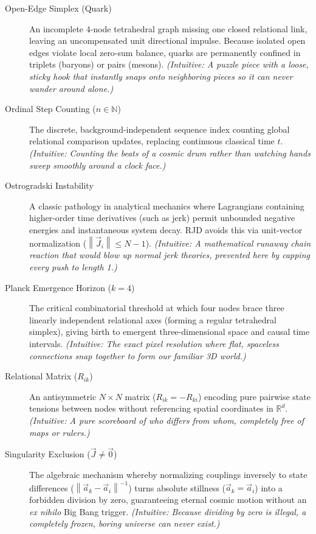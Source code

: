 \documentclass[11pt,a4paper]{article}
\theoremstyle{plain}
\theoremstyle{definition}
\theoremstyle{remark}
\newcommand{\Jerk}{\vec{J}}
\newcommand{\Acc}{\vec{a}}
\newcommand{\norm}[1]{\left\lVert #1 \right\rVert}
\begin{document}
\begin{description}
    \item[Open-Edge Simplex (Quark)] An incomplete $4$-node tetrahedral graph missing one closed relational link, leaving an uncompensated unit directional impulse. Because isolated open edges violate local zero-sum balance, quarks are permanently confined in triplets (baryons) or pairs (mesons). \emph{(Intuitive: A puzzle piece with a loose, sticky hook that instantly snaps onto neighboring pieces so it can never wander around alone.)}

    \item[Ordinal Step Counting ($n \in \mathbb{N}$)] The discrete, background-independent sequence index counting global relational comparison updates, replacing continuous classical time $t$. \emph{(Intuitive: Counting the beats of a cosmic drum rather than watching hands sweep smoothly around a clock face.)}

    \item[Ostrogradski Instability] A classic pathology in analytical mechanics where Lagrangians containing higher-order time derivatives (such as jerk) permit unbounded negative energies and instantaneous system decay. RJD avoids this via unit-vector normalization ($\norm{\Jerk_i} \leq N - 1$). \emph{(Intuitive: A mathematical runaway chain reaction that would blow up normal jerk theories, prevented here by capping every push to length 1.)}

    \item[Planck Emergence Horizon ($k=4$)] The critical combinatorial threshold at which four nodes brace three linearly independent relational axes (forming a regular tetrahedral simplex), giving birth to emergent three-dimensional space and causal time intervals. \emph{(Intuitive: The exact pixel resolution where flat, spaceless connections snap together to form our familiar 3D world.)}

    \item[Relational Matrix ($R_{ik}$)] An antisymmetric $N \times N$ matrix ($R_{ik} = -R_{ki}$) encoding pure pairwise state tensions between nodes without referencing spatial coordinates in $\mathbb{R}^d$. \emph{(Intuitive: A pure scoreboard of who differs from whom, completely free of maps or rulers.)}

    \item[Singularity Exclusion ($\Jerk \neq \vec{0}$)] The algebraic mechanism whereby normalizing couplings inversely to state differences ($\norm{\Acc_k - \Acc_i}^{-1}$) turns absolute stillness ($\Acc_k = \Acc_i$) into a forbidden division by zero, guaranteeing eternal cosmic motion without an \emph{ex nihilo} Big Bang trigger. \emph{(Intuitive: Because dividing by zero is illegal, a completely frozen, boring universe can never exist.)}


\end{description}
\end{document}
